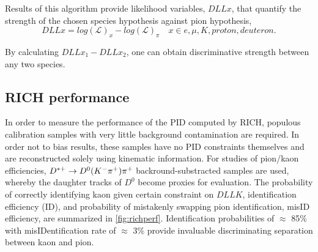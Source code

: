 Results of this algorithm provide likelihood variables, $DLL{x}$, that quantify the strength of the chosen species hypothesis against pion hypothesis,
\begin{equation}
	DLL{x} = log(\mathcal{L})_{x} - log(\mathcal{L})_{\pi} \quad  x\in{e, \mu, K, proton, deuteron}.
\end{equation}

By calculating $DLL{x_{1}} - DLL{x_{2}}$, one can obtain discriminative strength between any two species.

\subsection{RICH performance }
\label{RICHperf}
In order to measure the performance of the \Gls{PID} computed by \gls{RICH}, populous calibration samples with very little background contamination are required. In order not to bias results, these samples have no \Gls{PID} constraints themselves and are reconstructed solely using kinematic information. For studies of pion/kaon efficiencies, $D^{*+} \rightarrow D^{0}({K}^{-}{{\pi}^+}){{\pi}^+}$ backround-substracted samples are used, whereby the daughter tracks of $D^{0}$ become proxies for evaluation. The probability of correctly identifying kaon given certain constraint on $DLL{K}$, identification efficiency (\Gls{ID}), and probability of mistakenly swapping pion identification, \Gls{misID} efficiency, are summarized in \autoref{fig:richperf}. Identification probabilities of $\approx$ 85\% with misIDentification rate of $\approx$ 3\% provide invaluable discriminating separation between kaon and pion.





